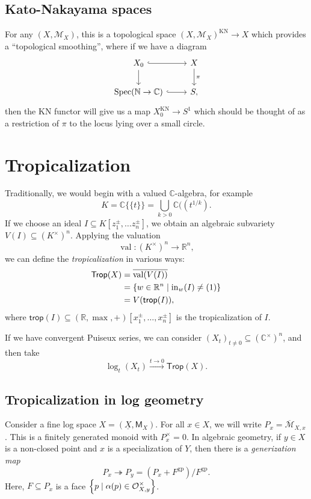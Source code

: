 \documentclass[leqno, openany]{memoir}
\theoremstyle{definition}
\theoremstyle{remark}
\theoremstyle{plain}
\theoremstyle{definition}
\theoremstyle{remark}
\newcommand{\N}{\mathbb{N}}
\newcommand{\R}{\mathbb{R}}
\newcommand{\C}{\mathbb{C}}
\newcommand{\mc}[1]{\mathcal{#1}}
\newcommand{\mr}[1]{\mathrm{#1}}
\newcommand{\ms}[1]{\mathsf{#1}}
\newcommand{\on}[1]{\operatorname{#1}}
\newcommand{\ol}[1]{\overline{#1}}
\newcommand{\ul}[1]{\underline{#1}}
\DeclareMathOperator{\Spec}{Spec}
\begin{document}
\subsection{Kato-Nakayama spaces}
\label{subsec:knspace}

For any $(X, \mc{M}_X)$, this is a topological space $(X, \mc{M}_X)^{\mr{KN}} \to X$ which provides a ``topological smoothing'', where if we have a diagram
\begin{equation*}
  \begin{tikzcd}
    X_0 \ar[hookrightarrow]{r} \ar{d} & X \ar{d}{\pi} \\
    \Spec(\N \to \C) \ar[hookrightarrow]{r} & S,
  \end{tikzcd}
\end{equation*}
then the KN functor will give us a map $X_0^{\mr{KN}} \to S^1$ which should be thought of as a restriction of $\pi$ to the locus lying over a small circle.

\section{Tropicalization}
\label{sec:tropicalization}

Traditionally, we would begin with a valued $\C$-algebra, for example
\[ K = \C \{\{t\}\} = \bigcup_{k > 0} \C((t^{1/k}). \]
If we choose an ideal $I \subseteq K[z_1^{\pm}, \ldots z_n^{\pm}]$, we obtain an algebraic subvariety $V(I) \subseteq (K^{\times})^n$. Applying the valuation
\[ \on{val} \colon (K^{\times})^n \to \R^n, \]
we can define the \textit{tropicalization} in various ways:
\begin{align*}
\ms{Trop}(X) &= \ol{\on{val}(V(I))} \\
             &= \qty{w \in \R^n \mid \on{in}_w(I) \neq (1)} \\
             &= V(\ms{trop}(I)),
\end{align*}
where $\ms{trop}(I) \subseteq (\R, \max, +)[x_1^{\pm}, \ldots, x_n^{\pm}]$ is the tropicalization of $I$.

If we have convergent Puiseux series, we can consider $(X_t)_{t \neq 0} \subseteq (\C^{\times})^n$, and then take
\[ \log_t(X_t) \xrightarrow{t \to 0} \ms{Trop}(X). \]

\subsection{Tropicalization in log geometry}
\label{subsec:trop_log}

Consider a fine log space $X = (\ul{X}, \ms{M}_X)$. For all $x \in X$, we will write $P_x = \ol{\mc{M}}_{X,x}$. This is a finitely generated monoid with $P_x^{\times} = \qty{0}$. In algebraic geometry, if $y \in X$ is a non-closed point and $x$ is a specialization of $Y$, then there is a \textit{generization map}
\[ P_x \twoheadrightarrow P_y = (P_x + F^{\mr{gp}})/ F^{\mr{gp}}. \]
Here, $F \subseteq P_x$ is a face $\qty{p \mid \alpha(p) \in \mc{O}_{X,y}^{\times}}$.
\end{document}
